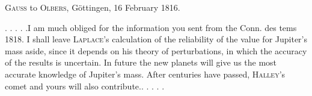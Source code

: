 \par{}\bigskip
\begin{center}
\textsc{Gauss} to \textsc{Olbers}, Göttingen, 16 February 1816.
\end{center}
\noindent\hspace*{\parindent}. . . . .\quad I am much obliged for the information you sent from the Conn. des tems 1818. I shall leave \textsc{Laplace}'s calculation of the reliability of the value for Jupiter's mass aside, since it depends on his theory of perturbations, in which the accuracy of the results is uncertain. In future the new planets will give us the most accurate knowledge of Jupiter's mass. After centuries have passed, \textsc{Halley}'s comet and yours will also contribute.\quad . . . . .
\par

